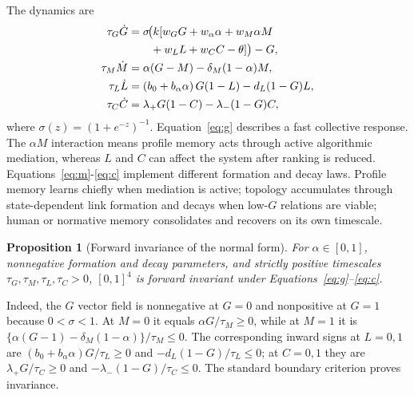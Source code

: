 \documentclass[pdflatex,sn-mathphys-num]{sn-jnl}
\newtheorem{proposition}{Proposition}
\begin{document}
The dynamics are
\begin{align}
\tau_G\dot G
  &=\sigma\!\bigl(k[w_GG+w_\alpha\alpha+w_M\alpha M \notag\\
  &\qquad {}+w_LL+w_CC-\theta]\bigr)-G, \label{eq:g}\\
\tau_M\dot M & = \alpha(G-M)-\delta_M(1-\alpha)M, \label{eq:m}\\
\tau_L\dot L & = \left(b_0+b_\alpha\alpha\right)G(1-L)-d_L(1-G)L, \label{eq:l}\\
\tau_C\dot C & = \lambda_+G(1-C)-\lambda_-(1-G)C, \label{eq:c}
\end{align}
where $\sigma(z)=(1+e^{-z})^{-1}$. Equation~\eqref{eq:g} describes a fast collective response. The $\alpha M$ interaction means profile memory acts through active algorithmic mediation, whereas $L$ and $C$ can affect the system after ranking is reduced. Equations~\eqref{eq:m}-\eqref{eq:c} implement different formation and decay laws. Profile memory learns chiefly when mediation is active; topology accumulates through state-dependent link formation and decays when low-$G$ relations are viable; human or normative memory consolidates and recovers on its own timescale.

\begin{proposition}[Forward invariance of the normal form]
\label{prop:forward-invariance}
For $\alpha\in[0,1]$, nonnegative formation and decay parameters, and strictly positive timescales $\tau_G,\tau_M,\tau_L,\tau_C>0$, $[0,1]^4$ is forward invariant under Equations~\eqref{eq:g}--\eqref{eq:c}.
\end{proposition}
Indeed, the $G$ vector field is nonnegative at $G=0$ and nonpositive at $G=1$ because $0<\sigma<1$. At $M=0$ it equals $\alpha G/\tau_M\geq0$, while at $M=1$ it is $\{\alpha(G-1)-\delta_M(1-\alpha)\}/\tau_M\leq0$. The corresponding inward signs at $L=0,1$ are $(b_0+b_\alpha\alpha)G/\tau_L\geq0$ and $-d_L(1-G)/\tau_L\leq0$; at $C=0,1$ they are $\lambda_+G/\tau_C\geq0$ and $-\lambda_-(1-G)/\tau_C\leq0$. The standard boundary criterion proves invariance.
\end{document}
